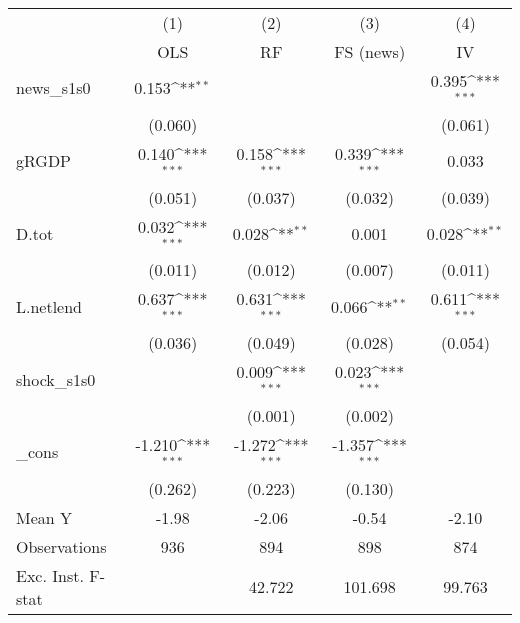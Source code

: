 {
\def\sym#1{\ifmmode^{#1}\else\(^{#1}\)\fi}
\begin{tabular}{l*{4}{c}}
\toprule
            &\multicolumn{1}{c}{(1)}&\multicolumn{1}{c}{(2)}&\multicolumn{1}{c}{(3)}&\multicolumn{1}{c}{(4)}\\
            &\multicolumn{1}{c}{OLS}&\multicolumn{1}{c}{RF}&\multicolumn{1}{c}{FS (news)}&\multicolumn{1}{c}{IV}\\
\midrule
news\_s1s0   &       0.153\sym{**} &                     &                     &       0.395\sym{***}\\
            &     (0.060)         &                     &                     &     (0.061)         \\
\addlinespace
gRGDP       &       0.140\sym{***}&       0.158\sym{***}&       0.339\sym{***}&       0.033         \\
            &     (0.051)         &     (0.037)         &     (0.032)         &     (0.039)         \\
\addlinespace
D.tot       &       0.032\sym{***}&       0.028\sym{**} &       0.001         &       0.028\sym{**} \\
            &     (0.011)         &     (0.012)         &     (0.007)         &     (0.011)         \\
\addlinespace
L.netlend   &       0.637\sym{***}&       0.631\sym{***}&       0.066\sym{**} &       0.611\sym{***}\\
            &     (0.036)         &     (0.049)         &     (0.028)         &     (0.054)         \\
\addlinespace
shock\_s1s0  &                     &       0.009\sym{***}&       0.023\sym{***}&                     \\
            &                     &     (0.001)         &     (0.002)         &                     \\
\addlinespace
\_cons      &      -1.210\sym{***}&      -1.272\sym{***}&      -1.357\sym{***}&                     \\
            &     (0.262)         &     (0.223)         &     (0.130)         &                     \\
\midrule
Mean Y      &       -1.98         &       -2.06         &       -0.54         &       -2.10         \\
Observations&         936         &         894         &         898         &         874         \\
Exc. Inst. F-stat&                     &      42.722         &     101.698         &      99.763         \\
\bottomrule
\end{tabular}
}
